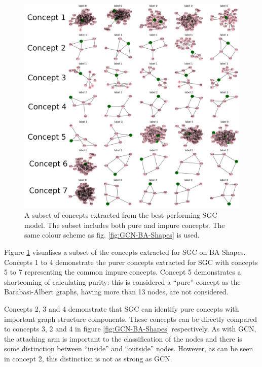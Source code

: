 \begin{figure}
    \centering
    \includegraphics[width=0.4\textheight]{figures/SGC-BA-Shapes}
    \caption{A subset of concepts extracted from the best performing SGC model. The subset includes both pure and impure concepts. The same colour scheme as fig. \ref{fig:GCN-BA-Shapes} is used.}
    \label{fig:SGC-BA-Shapes}
\end{figure}


Figure \ref{fig:SGC-BA-Shapes} visualises a subset of the concepts extracted for SGC on BA Shapes.
Concepts 1 to 4 demonstrate the purer concepts extracted for SGC with concepts 5 to 7 representing the common impure concepts.
Concept 5 demonstrates a shortcoming of calculating purity: this is considered a ``pure'' concept as the Barabasi-Albert graphs, having more than 13 nodes, are not considered. 

Concepts 2, 3 and 4 demonstrate that SGC can identify pure concepts with important graph structure components.
These concepts can be directly compared to concepts 3, 2 and 4 in figure \ref{fig:GCN-BA-Shapes} respectively.
As with GCN, the attaching arm is important to the classification of the nodes and there is some distinction between ``inside'' and ``outside'' nodes.
However, as can be seen in concept 2, this distinction is not as strong as GCN.

